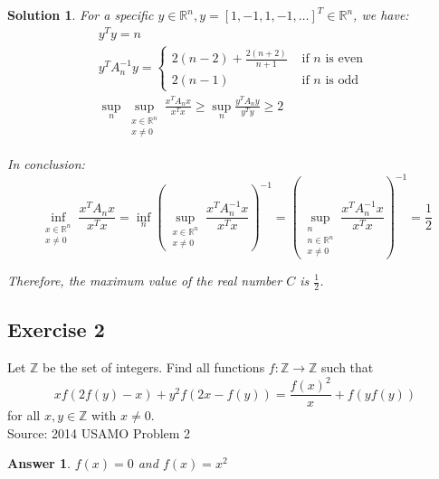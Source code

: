 \documentclass[12pt]{article}
\newtheorem*{answer*}{Answer}
\newtheorem*{solution*}{Solution}
\begin{document}
\begin{solution*}
For a specific $y \in \mathbb{R}^n, y=[1,-1,1,-1, \ldots]^T \in \mathbb{R}^n$, we have:
$$
\begin{gathered}
y^T y=n \\
y^T A_n^{-1} y= \begin{cases}2(n-2)+\frac{2(n+2)}{n+1} & \text { if } n \text { is even } \\
2(n-1) & \text { if } n \text { is odd }\end{cases} \\
\sup _n \sup _{\substack{x \in \mathbb{R}^n \\
x \neq 0}} \frac{x^T A_n x}{x^T x} \geq \sup _n \frac{y^T A_n y}{y^T y} \geq 2
\end{gathered}
$$

In conclusion:
$$
\inf _{\substack{x \in \mathbb{R}^n \\ x \neq 0}} \frac{x^T A_n x}{x^T x}=\inf _n\left(\sup _{\substack{x \in \mathbb{R}^n \\ x \neq 0}} \frac{x^T A_n^{-1} x}{x^T x}\right)^{-1}=\left(\sup _{\substack{n \\ n \in \mathbb{R}^n \\ x \neq 0}} \frac{x^T A_n^{-1} x}{x^T x}\right)^{-1}=\frac{1}{2}
$$

Therefore, the maximum value of the real number $C$ is $\frac{1}{2}$.

\end{solution*}






\subsection*{Exercise 2}
Let $\mathbb{Z}$ be the set of integers. Find all functions $f : \mathbb{Z} \rightarrow \mathbb{Z}$ such that $$xf(2f(y)-x)+y^2f(2x-f(y))=\frac{f(x)^2}{x}+f(yf(y))$$ for all $x, y \in \mathbb{Z}$ with $x \neq 0$.
\\

Source: 2014 USAMO Problem 2\\

\begin{answer*}
$\boxed{f(x)=0}$ and $\boxed{f(x)=x^2}$
\end{answer*}
\end{document}
